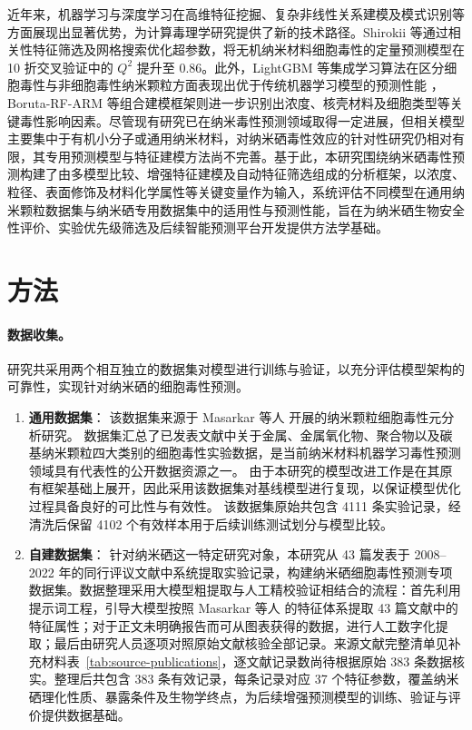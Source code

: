 \documentclass[letterpaper]{article}
\begin{document}
近年来，机器学习与深度学习在高维特征挖掘、复杂非线性关系建模及模式识别等方面展现出显著优势，为计算毒理学研究提供了新的技术路径\cite{hosni2025mlnp}。Shirokii 等通过相关性特征筛选及网格搜索优化超参数，将无机纳米材料细胞毒性的定量预测模型在 10 折交叉验证中的 $Q^2$ 提升至 0.86\cite{shirokii2023quantitative}。此外，LightGBM 等集成学习算法在区分细胞毒性与非细胞毒性纳米颗粒方面表现出优于传统机器学习模型的预测性能\cite{hosni2025mlnp}
，Boruta-RF-ARM 等组合建模框架则进一步识别出浓度、核壳材料及细胞类型等关键毒性影响因素\cite{yildirim2025rheumatoid}。尽管现有研究已在纳米毒性预测领域取得一定进展，但相关模型主要集中于有机小分子或通用纳米材料，对纳米硒毒性效应的针对性研究仍相对有限，其专用预测模型与特征建模方法尚不完善。基于此，本研究围绕纳米硒毒性预测构建了由多模型比较、增强特征建模及自动特征筛选组成的分析框架，以浓度、粒径、表面修饰及材料化学属性等关键变量作为输入，系统评估不同模型在通用纳米颗粒数据集与纳米硒专用数据集中的适用性与预测性能，旨在为纳米硒生物安全性评价、实验优先级筛选及后续智能预测平台开发提供方法学基础。


\section{方法}

\paragraph{数据收集。}
研究共采用两个相互独立的数据集对模型进行训练与验证，以充分评估模型架构的可靠性，实现针对纳米硒的细胞毒性预测。

\begin{enumerate}
  \item \textbf{通用数据集}：
该数据集来源于 Masarkar 等人 \cite{masarkar2024} 开展的纳米颗粒细胞毒性元分析研究。
数据集汇总了已发表文献中关于金属、金属氧化物、聚合物以及碳基纳米颗粒四大类别的细胞毒性实验数据，是当前纳米材料机器学习毒性预测领域具有代表性的公开数据资源之一。
由于本研究的模型改进工作是在其原有框架基础上展开，因此采用该数据集对基线模型进行复现，以保证模型优化过程具备良好的可比性与有效性。
该数据集原始共包含 4111 条实验记录，经清洗后保留 4102 个有效样本用于后续训练测试划分与模型比较。

  \item \textbf{自建数据集}：
针对纳米硒这一特定研究对象，本研究从 43 篇发表于 2008--2022 年的同行评议文献中系统提取实验记录，构建纳米硒细胞毒性预测专项数据集。数据整理采用大模型粗提取与人工精校验证相结合的流程：首先利用提示词工程，引导大模型按照 Masarkar 等人\cite{masarkar2024} 的特征体系提取 43 篇文献中的特征属性；对于正文未明确报告而可从图表获得的数据，进行人工数字化提取；最后由研究人员逐项对照原始文献核验全部记录。来源文献完整清单见补充材料表~\ref{tab:source-publications}，逐文献记录数尚待根据原始 383 条数据核实。整理后共包含 383 条有效记录，每条记录对应 37 个特征参数，覆盖纳米硒理化性质、暴露条件及生物学终点，为后续增强预测模型的训练、验证与评价提供数据基础。
\end{enumerate}
\end{document}
